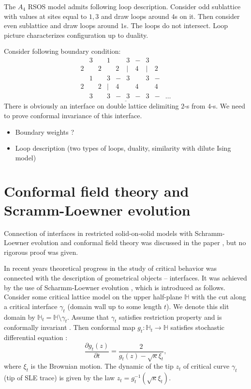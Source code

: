 \documentclass[12pt]{article}
\begin{document}
The $A_4$ RSOS model admits following loop description. Consider odd
sublattice with values at sites equal to $1,3$ and draw loops around
$4$s on it. Then consider even sublattice and draw loops around $1$s.
The loops do not intersect. Loop picture characterizes configuration
up to duality. 


Consider following boundary condition:
\begin{equation}
  \label{eq:13}
  \underline{\begin{array}{llllllllll}
    & 3 & & 1 &  & 3 & - & 3 & & \\
    2 & & 2 &  & 2 & | & 4 & | & 2\\
    & 1 & & 3 & - & 3 & & 3 &- & \\
    2 & & 2 & | & 4 & & 4 & & 4\\
    &  3 & & 3 &- & 3 &- & 3 &- &\dots
  \end{array}}
\end{equation}
There is obviously an interface on double lattice delimiting $2$-s
from $4$-s. We need to prove conformal invariance of this interface. 

\begin{itemize}
\item Boundary weights ?
\item Loop description (two types of loops, duality, similarity with dilute Ising model) 
\end{itemize}

\section{Conformal field theory and Scramm-Loewner evolution}
\label{sec:conf-field-theory}

Connection of interfaces in restricted solid-on-solid models with
Schramm-Loewner evolution and conformal field theory was discussed in
the paper \cite{cardy2007ade}, but no rigorous proof was given.

In recent
years theoretical progress in the study of critical behavior was connected with the description of
geometrical objects -- interfaces. It was achieved by the use of
Scharmm-Loewner evolution \cite{schramm2000scaling}, which is
introduced as follows. 
Consider some critical lattice model on the upper half-plane
$\mathbb{H}$ with the cut along a critical interface $\gamma_{t}$
(domain wall up to some length $t$). We denote this slit domain by
$\mathbb{H}_{t}=\mathbb{H}\setminus \gamma_{t}$. Assume that
$\gamma_{t}$ satisfies restriction property and is conformally
invariant \cite{Cardy:2005kh}. Then conformal map
$g_{t}:\mathbb{H}_{t}\to \mathbb{H}$ satisfies stochastic differential
equation \cite{schramm2000scaling}:
\begin{equation}
\label{eq:19}
  \frac{\partial g_t(z)}{\partial t} = \frac{ 2}{g_t(z)-\sqrt{\kappa}\xi_{t}} ,
\end{equation}
where $\xi_{t}$ is the Brownian motion. The dynamic of the tip $z_{t}$ of critical curve $\gamma_{t}$ (tip of SLE trace) is given by the law $z_{t}=g_{t}^{-1}(\sqrt{\kappa}\xi_{t})$. 
\end{document}
